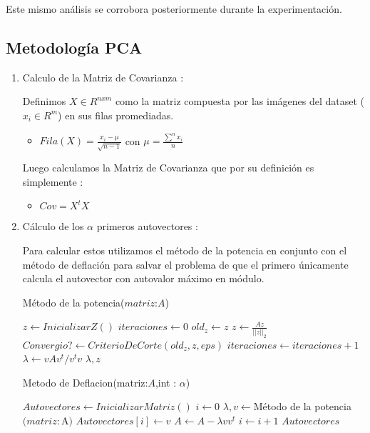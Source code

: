 Este mismo análisis se corrobora posteriormente durante la experimentación.

\subsection{Metodología PCA}

 \begin{enumerate}
     \item Calculo de la Matriz de Covarianza :
     
Definimos $X \in R^{nxm}$ como la matriz compuesta por las imágenes del dataset ($x_i \in R^{m}$) en sus filas promediadas. 
\par

\begin{itemize}
	\item $Fila(X) =  \frac{x_i - \mu}{\sqrt{n-1}}$  con $\mu =\frac{\sum^{n} x_i}{n} $
\end{itemize}

Luego calculamos la Matriz de Covarianza que por su definición es simplemente :
\begin{itemize}
	\item $Cov=  X^{t}X $
\end{itemize}

\item Cálculo de los $\alpha$ primeros autovectores : 

Para calcular estos utilizamos el método de la potencia en conjunto con el método de deflación para salvar el problema de que el primero únicamente calcula el autovector con autovalor máximo en módulo.

\begin{algorithm}
\caption{Método de la potencia($matriz$:$A$)}
\begin{algorithmic}[1]
    \State $z \leftarrow InicializarZ()$
    \State $iteraciones \leftarrow 0$
        \State $old_z \leftarrow z$
        \State $z \leftarrow \frac{Az}{||z ||_2}$
        \State $Convergio? \leftarrow CriterioDeCorte(old_z,z,eps)$
        \State $iteraciones \leftarrow iteraciones +1$
    \EndWhile  
    \State $\lambda \leftarrow vAv^t/v^tv$
    \State
    \Return  $\lambda,z$
\end{algorithmic}
\end{algorithm}

\begin{algorithm}
\caption{Metodo de Deflacion(matriz:$A$,int : $\alpha$)}
\begin{algorithmic}[1]
    \State $Autovectores \leftarrow InicializarMatriz()$
    \State $i \leftarrow 0$
        \State $\lambda,v \leftarrow $Método de la potencia$(matriz:$A$)$
        \State $Autovectores[i] \leftarrow v$
        \State $A \leftarrow A - \lambda vv^t$
        \State $i \leftarrow i +1$
    \EndWhile  
    \State
    \Return  $Autovectores$
\end{algorithmic}
\end{algorithm}


\end{enumerate}
